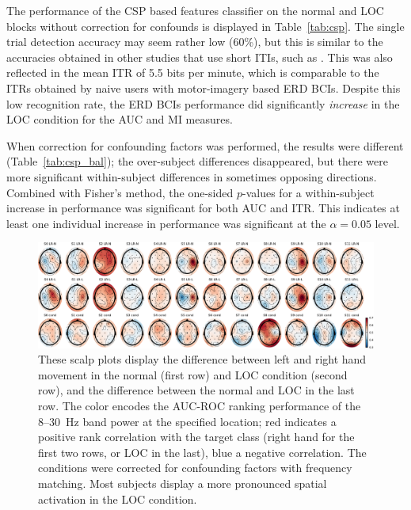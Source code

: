 The performance of the \ac{CSP} based features classifier on the normal and
\ac{LOC} blocks without correction for confounds is displayed in
Table~\ref{tab:csp}. The single trial detection accuracy may seem rather low
(60\%), but this is similar to the accuracies obtained in other studies that
use short \acp{ITI}, such as \cite{jatzev2008ecn}. This was also reflected in
the mean \ac{ITR} of 5.5 bits per minute, which is comparable to the \acp{ITR}
obtained by naive users with motor-imagery based \ac{ERD} \acp{BCI}.
%
Despite this low recognition rate, the \ac{ERD} \acp{BCI} performance did
significantly \emph{increase} in the \ac{LOC} condition for the \ac{AUC} and
\ac{MI} measures.

When correction for confounding factors was performed, the results were
different (Table~\ref{tab:csp_bal}); the over-subject differences disappeared,
but there were more significant within-subject differences in sometimes opposing
directions. Combined with Fisher's method, the one-sided $p$-values for a
within-subject increase in performance was significant for both \ac{AUC} and
\ac{ITR}. This indicates at least one individual increase in performance was
significant at the $\alpha=0.05$ level.

\begin{figure}
  \centering
  \includegraphics[width=\textwidth]{figs/bp_nlc.pdf}
  \caption{
  These scalp plots display the difference between left and right hand movement
  in the normal (first row) and \protect\ac{LOC} condition (second row), and
  the difference between the normal and \protect\ac{LOC} in the last row. 
  The color encodes the \protect\ac{AUC}-\protect\ac{ROC} ranking performance
  of the 8--30~Hz band power at the specified location; red indicates a
  positive rank correlation with the target class (right hand for the first two
  rows, or \protect\ac{LOC} in the last), blue a negative correlation. The
  conditions were corrected for confounding factors with frequency matching.
  Most subjects display a more pronounced spatial activation in
  the \protect\ac{LOC} condition.}
  \label{fig:ERD_diff} 
\end{figure}

